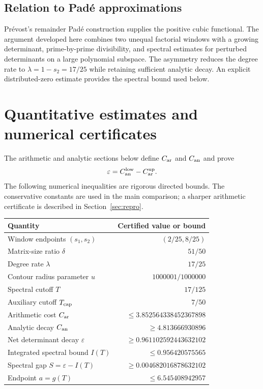 \documentclass[11pt]{article}
\theoremstyle{definition}\newtheorem{definition}[theorem]{Definition}
\theoremstyle{remark}\newtheorem{remark}[theorem]{Remark}
\begin{document}
\subsection{Relation to Pad\'e approximations}
Pr\'evost's remainder Pad\'e construction supplies the positive cubic functional. The argument developed here combines two unequal factorial windows with a growing determinant, prime-by-prime divisibility, and spectral estimates for perturbed determinants on a large polynomial subspace. The asymmetry reduces the degree rate to $\lambda=1-s_2=17/25$ while retaining sufficient analytic decay. An explicit distributed-zero estimate provides the spectral bound used below.

\section{Quantitative estimates and numerical certificates}\label{sec:certificate}
The arithmetic and analytic sections below define $C_{\rm ar}$ and $C_{\rm an}$ and prove
\[
 \varepsilon=C_{\rm an}^{\rm low}-C_{\rm ar}^{\rm up}.
\]
The following numerical inequalities are rigorous directed bounds. The conservative constants are used in the main comparison; a sharper arithmetic certificate is described in Section~\ref{sec:repro}.
\begin{center}
\begin{tabular}{@{}p{.45\linewidth}r@{}}
\toprule
Quantity & Certified value or bound\\
\midrule
Window endpoints $(s_1,s_2)$ & $(2/25,8/25)$\\
Matrix-size ratio $\delta$ & $51/50$\\
Degree rate $\lambda$ & $17/25$\\
Contour radius parameter $u$ & $1000001/1000000$\\
Spectral cutoff $T$ & $17/125$\\
Auxiliary cutoff $T_{\rm cap}$ & $7/50$\\
Arithmetic cost $C_{\rm ar}$ & $\le3.852564338452367898$\\
Analytic decay $C_{\rm an}$ & $\ge4.813666930896$\\
Net determinant decay $\varepsilon$ & $\ge0.961102592443632102$\\
Integrated spectral bound $I(T)$ & $\le0.956420575565$\\
Spectral gap $S=\varepsilon-I(T)$ & $\ge0.004682016878632102$\\
Endpoint $a=g(T)$ & $\le6.545408942957$\\
\bottomrule
\end{tabular}
\end{center}
\end{document}
